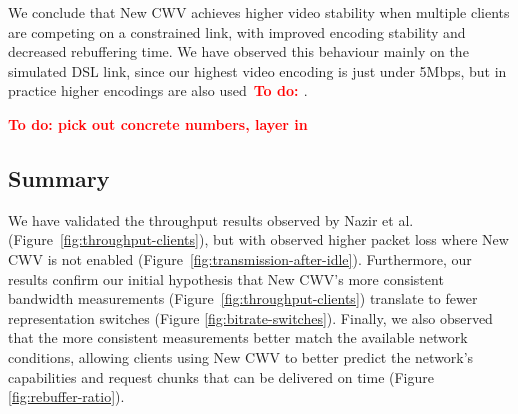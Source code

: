 \documentclass[10pt,sigconf,anonymous]{acmart}
\newcommand{\todo}[1]{\textbf{\textcolor{red}{To do: #1}}}
\begin{document}
We conclude that New CWV achieves higher video stability when multiple clients are competing on a constrained link, with improved encoding stability and decreased rebuffering time. We have observed this behaviour mainly on the simulated DSL link, since our highest video encoding is just under 5Mbps, but in practice higher encodings are also used~\todo{\cite{}}.

\todo{pick out concrete numbers, layer in}

\subsection{Summary}
\label{sec:summary}

We have validated the throughput results observed by Nazir et al.~\cite{Nazir-2014-performance-evaluation-congestion-window-validation-dash-newcwv} (Figure~\ref{fig:throughput-clients}), but with observed higher packet loss where New CWV is not enabled (Figure~\ref{fig:transmission-after-idle}). Furthermore, our results confirm our initial hypothesis that New CWV's more consistent bandwidth measurements (Figure~\ref{fig:throughput-clients}) translate to fewer representation switches (Figure \ref{fig:bitrate-switches}). Finally, we also observed that the more consistent measurements better match the available network conditions, allowing clients using New CWV to better predict the network's capabilities and request chunks that can be delivered on time (Figure \ref{fig:rebuffer-ratio}).

\end{document}

